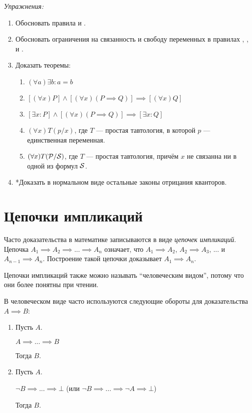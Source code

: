 {\it Упражнения:}
\begin{enumerate}
	\item{}Обосновать правила \Eii{} и \Eee{}.
	\item{}Обосновать ограничения на связанность и свободу переменных в правилах
	\Aii{}, \Aee{}, \Eii{} и \Eee{}.
	\pagebreak
	\item{}\label{ex:obv_thm}Доказать теоремы:
	\begin{fullwidth}
		\begin{multicols}{2}
			\begin{enumerate}
				\item{}$(\forall a)\exists b:a=b$
				\item{}$[(\forall x)P]\land[(\forall x)(P\implies Q)]
					\implies [(\forall x)Q]$\label{thm:obv_forall}
				\item{}$[\exists x:P]\land[(\forall x)(P\implies Q)]
					\implies [\exists x:Q]$
				\item{}$(\forall x)T(p/x)$, где $T$ --- простая тавтология,
				в которой $p$ --- единственная переменная.
				\item{}$(\forall x)T(\mathcal P/\mathcal S)$, где $T$ --- простая тавтология,
				причём $x$ не связанна ни в одной из формул $\mathcal S$.\label{thm:obv_taut}
			\end{enumerate}
		\end{multicols}
	\end{fullwidth}
	\item{}*Доказать в нормальном виде остальные законы отрицания кванторов.
\end{enumerate}

\section{Цепочки импликаций}

Часто доказательства в математике записываются в виде {\it цепочек импликаций}.
Цепочка $A_1\implies A_2\implies...\implies A_{n}$ означает, что $A_1\implies A_2$,
$A_2\implies A_3$, ... и $A_{n-1}\implies A_{n}$.
Построение такой цепочки доказывает $A_1\implies A_{n}$.

Цепочки импликаций также можно называть ``человеческим видом'', потому что они более
понятны при чтении.

В человеческом виде часто используются следующие обороты
для доказательства $A\implies B$:
\begin{enumerate}
	\item{}
	Пусть $A$.

	$A\implies ...\implies B$

	Тогда $B$.
	\item{}
	Пусть $A$.

	$\lnot B\implies ...\implies \bot$
	(или $\lnot B\implies ...\implies \lnot A\implies\bot$)

	Тогда $B$.
\end{enumerate}


